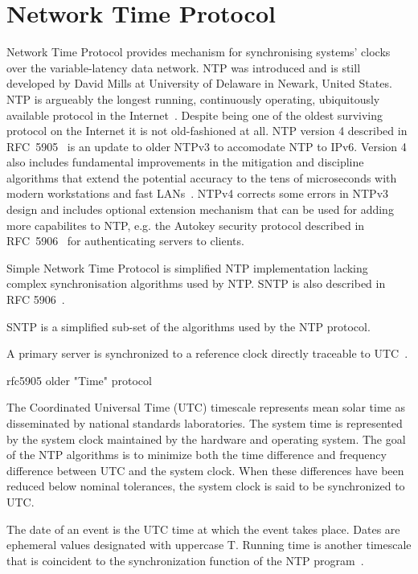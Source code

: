 
\chapter{Network Time Protocol}
Network Time Protocol provides mechanism for synchronising systems' clocks over the variable-latency data network.
NTP was introduced and is still developed by David Mills at University of Delaware in Newark, United States.
NTP is argueably the longest running, continuously operating,
ubiquitously available protocol in the Internet~\cite{ntp-overview}.
Despite being one of the oldest surviving protocol on the Internet it is not old-fashioned at all.
NTP version 4 described in RFC~5905~\cite{rfc5905} is an update to older NTPv3 to accomodate NTP to IPv6.
Version 4 also includes fundamental improvements in
the mitigation and discipline algorithms that extend
the potential accuracy to the tens of microseconds with modern
workstations and fast LANs~\cite{rfc5905}.
NTPv4 corrects some
errors in NTPv3 design and includes optional extension mechanism
that can be used for adding more capabilites to NTP, e.g. the
Autokey security protocol described in RFC~5906~\cite{rfc5906}
for authenticating servers to clients.

Simple Network Time Protocol is simplified NTP implementation lacking complex
synchronisation algorithms used by NTP. SNTP is also described in RFC 5906~\cite{rfc5906}.

SNTP is a simplified sub-set of the algorithms used by the NTP protocol.

A primary server is synchronized to a reference clock directly traceable
to UTC~\cite{rfc5905}.

\! 
\! rfc5905
\! older "Time" protocol


The Coordinated Universal Time (UTC) timescale represents mean solar
   time as disseminated by national standards laboratories.  The system
   time is represented by the system clock maintained by the hardware
   and operating system.  The goal of the NTP algorithms is to minimize
   both the time difference and frequency difference between UTC and the
   system clock.  When these differences have been reduced below nominal
   tolerances, the system clock is said to be synchronized to UTC.



   The date of an event is the UTC time at which the event takes place.
   Dates are ephemeral values designated with uppercase T.  Running time
   is another timescale that is coincident to the synchronization
   function of the NTP program~\cite{rfc5905}.



